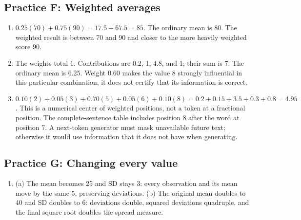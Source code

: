 \subsection*{Practice F: Weighted averages}
\begin{enumerate}[label=F\arabic*.,leftmargin=2.5em,itemsep=10pt]
\item $0.25(70)+0.75(90)=17.5+67.5=85$. The ordinary mean is 80. The weighted result is between 70 and 90 and closer to the more heavily weighted score 90.
\item The weights total 1. Contributions are 0.2, 1, 4.8, and 1; their sum is 7. The ordinary mean is 6.25. Weight 0.60 makes the value 8 strongly influential in this particular combination; it does not certify that its information is correct.
\item $0.10(2)+0.05(3)+0.70(5)+0.05(6)+0.10(8)=0.2+0.15+3.5+0.3+0.8=4.95$. This is a numerical center of weighted positions, not a token at a fractional position. The complete-sentence table includes position 8 after the word at position 7. A next-token generator must mask unavailable future text; otherwise it would use information that it does not have when generating.
\end{enumerate}

\subsection*{Practice G: Changing every value}
\begin{enumerate}[label=G\arabic*.,leftmargin=2.5em,itemsep=10pt]
\item (a) The mean becomes 25 and SD stays 3: every observation and its mean move by the same 5, preserving deviations. (b) The original mean doubles to 40 and SD doubles to 6: deviations double, squared deviations quadruple, and the final square root doubles the spread measure.
\end{enumerate}


